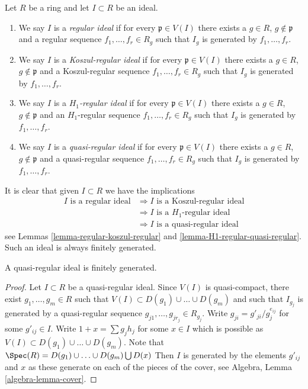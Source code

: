 \begin{definition}
\label{definition-regular-ideal}
Let $R$ be a ring and let $I \subset R$ be an ideal.
\begin{enumerate}
\item We say $I$ is a {\it regular ideal} if for every
$\mathfrak p \in V(I)$ there exists a $g \in R$, $g \not \in \mathfrak p$
and a regular sequence $f_1, \ldots, f_r \in R_g$ such that $I_g$
is generated by $f_1, \ldots, f_r$.
\item We say $I$ is a {\it Koszul-regular ideal} if for every
$\mathfrak p \in V(I)$ there exists a $g \in R$, $g \not \in \mathfrak p$
and a Koszul-regular sequence $f_1, \ldots, f_r \in R_g$ such that $I_g$
is generated by $f_1, \ldots, f_r$.
\item We say $I$ is a {\it $H_1$-regular ideal} if for every
$\mathfrak p \in V(I)$ there exists a $g \in R$, $g \not \in \mathfrak p$
and an $H_1$-regular sequence $f_1, \ldots, f_r \in R_g$ such that $I_g$
is generated by $f_1, \ldots, f_r$.
\item We say $I$ is a {\it quasi-regular ideal} if for every
$\mathfrak p \in V(I)$ there exists a $g \in R$, $g \not \in \mathfrak p$
and a quasi-regular sequence $f_1, \ldots, f_r \in R_g$ such that $I_g$
is generated by $f_1, \ldots, f_r$.
\end{enumerate}
\end{definition}

\noindent
It is clear that given $I \subset R$ we have the implications
\begin{align*}
I\text{ is a regular ideal}
& \Rightarrow
I\text{ is a Koszul-regular ideal} \\
& \Rightarrow
I\text{ is a }H_1\text{-regular ideal} \\
& \Rightarrow
I\text{ is a quasi-regular ideal}
\end{align*}
see Lemmas \ref{lemma-regular-koszul-regular} and
\ref{lemma-H1-regular-quasi-regular}. Such an ideal is always finitely
generated.

\begin{lemma}
\label{lemma-quasi-regular-ideal-finite}
A quasi-regular ideal is finitely generated.
\end{lemma}

\begin{proof}
Let $I \subset R$ be a quasi-regular ideal. Since $V(I)$ is quasi-compact,
there exist $g_1, \ldots, g_m \in R$ such that
$V(I) \subset D(g_1) \cup \ldots \cup D(g_m)$
and such that $I_{g_j}$ is generated by a quasi-regular sequence
$g_{j1}, \ldots, g_{jr_j} \in R_{g_j}$. Write $g_{ji} = g'_{ji}/g_j^{e_{ij}}$
for some $g'_{ij} \in I$. Write $1 + x = \sum g_j h_j$
for some $x \in I$ which is possible as
$V(I) \subset D(g_1) \cup \ldots \cup D(g_m)$.
Note that $\Spec(R) = D(g_1) \cup \ldots \cup D(g_m) \bigcup D(x)$
Then $I$ is generated by the elements $g'_{ij}$ and $x$ as
these generate on each of the pieces of the cover, see
Algebra, Lemma \ref{algebra-lemma-cover}.
\end{proof}

